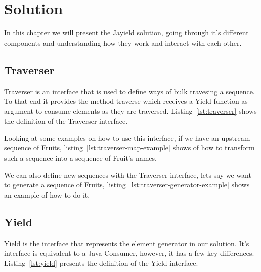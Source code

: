 \chapter{Solution}

In this chapter we will present the Jayield solution, going through it's different components and understanding how they work and interact with each other.

\section{Traverser}

Traverser is an interface that is used to define ways of bulk travesing a sequence. To that end it provides the method traverse which receives a Yield function as argument to consume elements as they are traversed. Listing~\ref{lst:traverser} shows the definition of the Traverser interface.



Looking at some examples on how to use this interface, if we have an upstream sequence of Fruits, listing~\ref{lst:traverser-map-example} shows of how to transform such a sequence into a sequence of Fruit's names.



\newpage
We can also define new sequences with the Traverser interface, lets say we want to generate a sequence of Fruits, listing~\ref{lst:traverser-generator-example} shows an example of how to do it.



\section{Yield}

Yield is the interface that represents the element generator in our solution. It's interface is equivalent to a Java Consumer, however, it has a few key differences. Listing~\ref{lst:yield} presents the definition of the Yield interface.



